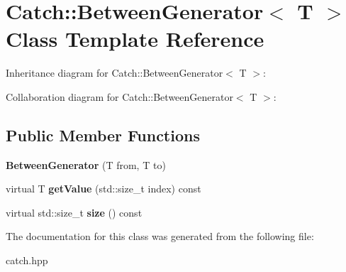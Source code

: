 \hypertarget{classCatch_1_1BetweenGenerator}{}\section{Catch\+:\+:Between\+Generator$<$ T $>$ Class Template Reference}
\label{classCatch_1_1BetweenGenerator}


Inheritance diagram for Catch\+:\+:Between\+Generator$<$ T $>$\+:


Collaboration diagram for Catch\+:\+:Between\+Generator$<$ T $>$\+:
\subsection*{Public Member Functions}
\begin{DoxyCompactItemize}
\item 
{\bfseries Between\+Generator} (T from, T to)\hypertarget{classCatch_1_1BetweenGenerator_a835a057d691ae37caef660624099b51c}{}\label{classCatch_1_1BetweenGenerator_a835a057d691ae37caef660624099b51c}

\item 
virtual T {\bfseries get\+Value} (std\+::size\+\_\+t index) const \hypertarget{classCatch_1_1BetweenGenerator_af83575d62cc727ca995446cff4d6c26c}{}\label{classCatch_1_1BetweenGenerator_af83575d62cc727ca995446cff4d6c26c}

\item 
virtual std\+::size\+\_\+t {\bfseries size} () const \hypertarget{classCatch_1_1BetweenGenerator_aa53a04a259e796ba2b5adabed79474b5}{}\label{classCatch_1_1BetweenGenerator_aa53a04a259e796ba2b5adabed79474b5}

\end{DoxyCompactItemize}


The documentation for this class was generated from the following file\+:\begin{DoxyCompactItemize}
\item 
catch.\+hpp\end{DoxyCompactItemize}
